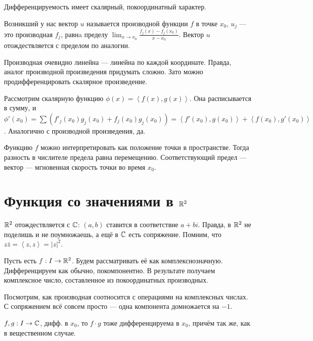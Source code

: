 \documentclass[12pt]{report}
\begin{document}
\begin{cor}
Дифференцируемость имеет скалярный, покоординатный характер.
\end{cor}

Возникший у нас вектор $u$ называется производной функции $f$ в точке $x_0$, $u_j$ --- это производная $f_j$, равнa пределу $\lim_{x \to x_0}{\frac{f_j(x)-f_j(x_0)}{x-x_0}}$. Вектор $u$ отождествляется с пределом по аналогии.

Производная очевидно линейна --- линейна по каждой координате. Правда, аналог производной произведения придумать сложно. Зато можно продифференцировать скалярное произведение.

\begin{defn}
Рассмотрим скалярную функцию $\phi(x) = \left<f(x),g(x)\right>$. Она расписывается в сумму, и $\phi'(x_0) = \sum(f'_j(x_0)g_j(x_0) + f_j(x_0)g_j(x_0)) = \left<f'(x_0),g(x_0)\right> + \left<f(x_0),g'(x_0)\right>$. Аналогично с производной произведения, да.
\end{defn}

\begin{note}
Функцию $f$ можно интерпретировать как положение точки в пространстве. Тогда разность в числителе предела равна перемещению. Соответствующий предел --- вектор --- мгновенная скорость точки во время $x_0$.
\end{note}

\section{Функция со значениями в $\mathbb{R}^2$}
$\mathbb{R}^2$ отождествляется с $\mathbb{C}$: $(a,b)$ ставится в соответствие $a+bi$. Правда, в $\mathbb{R}^2$ не поделишь и не поумножаешь, а ещё в $\mathbb{C}$ есть сопряжение. Помним, что $z \bar{z} = \left<z,z\right> = |z|^2$.

\begin{defn}
Пусть есть $f: I \to \mathbb{R}^2$. Будем рассматривать её как комплекснозначную. Дифференцируем как обычно, покомпонентно. В результате получаем комплексное число, составленное из покоординатных производных.
\end{defn}

Посмотрим, как производная соотносится с операциями на комплексных числах. С сопряжением всё совсем просто --- одна компонента домножается на $-1$.

\begin{lm}
$f,g: I \to \mathbb{C}$, дифф. в $x_0$, то $f \cdot g$ тоже дифференцируема в $x_0$, причём так же, как в вещественном случае.
\end{lm}
\end{document}
